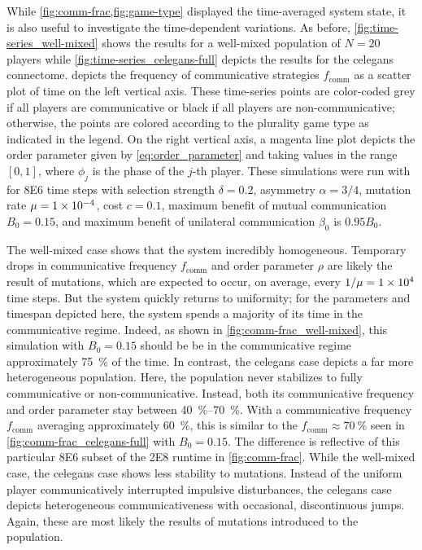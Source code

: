 \documentclass[pdflatex,lineno,referee,sn-mathphys-ay]{sn-jnl}
\begin{document}
While \cref{fig:comm-frac,fig:game-type} displayed
the time-averaged system state,
it is also useful to investigate the time-dependent variations.
As before, \cref{fig:time-series_well-mixed} shows the results
for a well-mixed population of $N=20$ players
while \cref{fig:time-series_celegans-full} depicts the results
for the \gls{celegans} connectome.
 depicts the frequency
of communicative strategies $f_{\text{comm}}$
as a scatter plot of time on the left vertical axis.
These time-series points are color-coded
grey if all players are communicative or
black if all players are non-communicative;
otherwise, the points are colored according
to the plurality game type as indicated in the legend.
On the right vertical axis,
a magenta line plot depicts the order parameter
given by \cref{eq:order_parameter} and
taking values in the range $[0,1]$,
where $\phi_j$ is the phase of the $j$-th player.
These simulations were run with
for \num{8E6} time steps with
selection strength $\delta = 0.2$,
asymmetry $\alpha = 3/4$,
mutation rate $\mu=\num{1E-4}$,
cost $c = \num{0.1}$,
maximum benefit of mutual communication $B_0 = 0.15$,
and maximum benefit of unilateral communication $\beta_0$ is $\num{0.95} B_0$.

The  well-mixed case
shows that the system incredibly homogeneous.
Temporary drops in communicative frequency $f_{\text{comm}}$
and order parameter $\rho$ are likely the result of mutations,
which are expected to occur, on average, every $1/\mu = \num{1E4}$ time steps.
But the system quickly returns to uniformity;
for the parameters and timespan depicted here,
the system spends a majority of its time in the communicative regime.
Indeed, as shown in \cref{fig:comm-frac_well-mixed},
this simulation with $B_0 = 0.15$ should be be in the communicative regime
approximately \SI{75}{\percent} of the time.
In contrast, the  \gls{celegans} case
depicts a far more heterogeneous population.
Here, the population never stabilizes to fully communicative or non-communicative.
Instead, both its communicative frequency and order parameter
stay between \SIrange{40}{70}{\percent}.
With a communicative frequency $f_{\text{comm}}$ averaging approximately \SI{60}{\percent},
this is similar to the $f_{\text{comm}} \approx \SI{70}{\percent}$ seen
in \cref{fig:comm-frac_celegans-full} with $B_0 = 0.15$.
The difference is reflective of this particular \num{8E6} subset
of the \num{2E8} runtime in \cref{fig:comm-frac}.
While the  well-mixed case,
the \gls{celegans} case shows less stability to mutations.
Instead of the uniform player communicatively interrupted
impulsive disturbances,
the \gls{celegans} case depicts heterogeneous communicativeness
with occasional, discontinuous jumps.
Again, these are most likely the results of mutations introduced
to the population.
\end{document}
